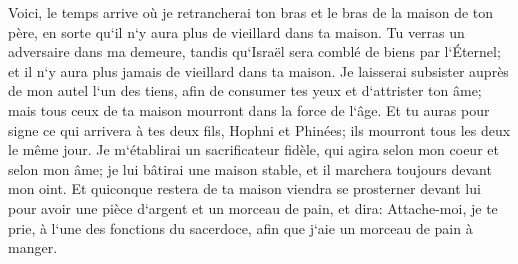 \verse Voici, le temps arrive où je retrancherai ton bras et le bras de la maison de ton père, en sorte qu`il n`y aura plus de vieillard dans ta maison. 
\verse Tu verras un adversaire dans ma demeure, tandis qu`Israël sera comblé de biens par l`Éternel; et il n`y aura plus jamais de vieillard dans ta maison. 
\verse Je laisserai subsister auprès de mon autel l`un des tiens, afin de consumer tes yeux et d`attrister ton âme; mais tous ceux de ta maison mourront dans la force de l`âge. 
\verse Et tu auras pour signe ce qui arrivera à tes deux fils, Hophni et Phinées; ils mourront tous les deux le même jour. 
\verse Je m`établirai un sacrificateur fidèle, qui agira selon mon coeur et selon mon âme; je lui bâtirai une maison stable, et il marchera toujours devant mon oint. 
\verse Et quiconque restera de ta maison viendra se prosterner devant lui pour avoir une pièce d`argent et un morceau de pain, et dira: Attache-moi, je te prie, à l`une des fonctions du sacerdoce, afin que j`aie un morceau de pain à manger. 

